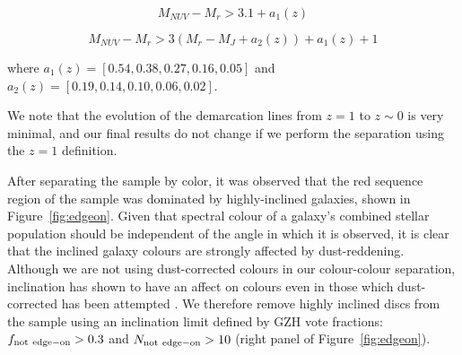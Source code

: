 \documentclass[useAMS,usenatbib]{mn2e}
\begin{document}
\begin{equation}
M_{NUV}-M_{r} > 3.1 + a_{1}(z)
\end{equation}

\begin{equation}
M_{NUV}-M_{r} > 3(M_{r}-M_{J} + a_{2}(z))+ a_{1}(z) + 1  
\end{equation}

\noindent where $a_{1}(z) = [0.54,0.38,0.27,0.16,0.05]$ and $a_{2}(z) = [0.19,0.14,0.10,0.06,0.02]$. 

We note that the evolution of the demarcation lines from $z=1$ to $z\sim0$ is very minimal, and our final results do not change if we perform the separation using the $z=1$ definition.

After separating the sample by color, it was observed that the red sequence region of the sample was dominated by highly-inclined galaxies, shown in Figure~\ref{fig:edgeon}. Given that spectral colour of a galaxy's combined stellar population should be independent of the angle in which it is observed, it is clear that the inclined galaxy colours are strongly affected by dust-reddening. Although we are not using dust-corrected colours in our colour-colour separation, inclination has shown to have an affect on colours even in those which dust-corrected has been attempted \citep{Morselli2016a,Devour2017}. We therefore remove highly inclined discs from the sample using an inclination limit defined by GZH vote fractions: $f_{\rm not~edge-on} > 0.3$ and $N_{\rm not~edge-on}>10$ (right panel of Figure~\ref{fig:edgeon}).  
\end{document}
